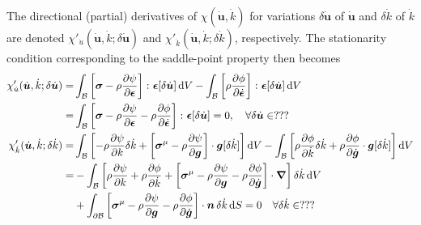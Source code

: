 The directional (partial) derivatives of $\chi(\dot{\bm{u}},\dot{k})$ for variations $\delta\dot{\bm{u}}$ of $\dot{\bm{u}}$ and $\delta\dot{k}$ of $\dot{k}$ are denoted $\chi'_{\dot{u}}(\dot{\bm{u}},\dot{k};\delta\dot{\bm{u}})$ and $\chi'_{\dot{k}}(\dot{\bm{u}},\dot{k};\delta\dot{k})$, respectively. The stationarity condition corresponding to the saddle-point property then becomes
\begin{subequations}\label{eq:8-2}
    \begin{align}
    \chi'_{\dot{u}}(\dot{\bm{u}},\dot{k};\delta\dot{\bm{u}})
    =&
    \int_{\mathcal{B}} \left[\bm{\sigma} - \rho\frac{\partial \psi}{\partial \bm{\epsilon}}\right] \colon \bm{\epsilon}[\delta\dot{\bm{u}}] \mathop{}\!\mathrm{d} V -
     \int_{\mathcal{B}} \left[\rho\frac{\partial \phi}{\partial \dot{\bm{\epsilon}}}\right] \colon \bm{\epsilon}[\delta\dot{\bm{u}}] \mathop{}\!\mathrm{d} V
    \nonumber \\
    =&
    \int_{\mathcal{B}} \left[\bm{\sigma} - \rho\frac{\partial \psi}{\partial \bm{\epsilon}} -  \rho\frac{\partial \phi}{\partial \dot{\bm{\epsilon}}} \right] \colon \bm{\epsilon}[\delta\dot{\bm{u}}]  = 0,
    \quad \forall \delta\dot{\bm{u}}\in ???
\label{eq:8-2a}\\
    \chi'_{\dot{k}}(\dot{\bm{u}},\dot{k};\delta\dot{k})
    =&
    \int_{\mathcal{B}} \left[-\rho\frac{\partial \psi}{\partial k} \delta\dot{k} + \left[\bm{\sigma}^{\mathrm{\mu}} - \rho\frac{\partial \psi}{\partial \bm{g}}\right] \cdot \bm{g}[\delta\dot{k}]\right] \mathop{}\!\mathrm{d} V -
    \int_{\mathcal{B}} \left[\rho\frac{\partial \phi}{\partial \dot{k}} \delta\dot{k} + \rho\frac{\partial \phi}{\partial \dot{\bm{g}}} \cdot \bm{g}[\delta\dot{k}]\right] \mathop{}\!\mathrm{d} V
    \nonumber \\
    =&
     -\int_{\mathcal{B}} \left[\rho\frac{\partial \psi}{\partial k} + \rho\frac{\partial \phi}{\partial \dot{k}} +
     \left[\bm{\sigma}^{\mathrm{\mu}} - \rho\frac{\partial \psi}{\partial \bm{g}} - \rho\frac{\partial \phi}{\partial \dot{\bm{g}}}\right] \cdot \bm{\nabla}\right]\delta\dot{k} \mathop{}\!\mathrm{d} V
    \nonumber \\
     &+ \int_{\partial\mathcal{B}} \left[\bm{\sigma}^{\mathrm{\mu}} - \rho\frac{\partial \psi}{\partial \bm{g}} - \rho\frac{\partial \phi}{\partial \dot{\bm{g}}}\right] \cdot \bm{n}\, \delta\dot{k}\mathop{}\!\mathrm{d} S = 0
    \quad \forall \delta\dot{k}\in ???
\label{eq:8-2b}
    \end{align}
\end{subequations}
